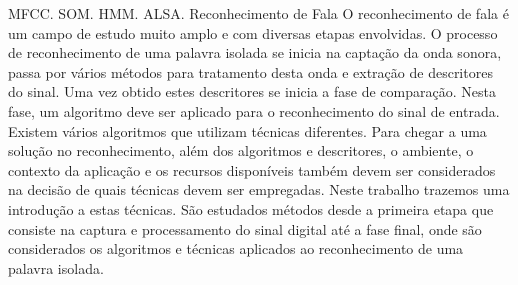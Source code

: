 \begin{resumo}{MFCC. SOM. HMM. ALSA. Reconhecimento de Fala}
\label{sec:resumo}
O  reconhecimento de fala é um campo de estudo muito amplo e com diversas etapas envolvidas. O processo de reconhecimento de uma palavra isolada se inicia na captação da onda sonora, passa por vários métodos para tratamento desta onda e extração de descritores do sinal. Uma vez obtido estes descritores se inicia a fase de comparação. Nesta fase, um algoritmo deve ser aplicado para o reconhecimento do sinal de entrada. Existem vários algoritmos que utilizam técnicas diferentes. Para chegar a uma solução no reconhecimento, além dos algoritmos e descritores, o ambiente, o contexto da aplicação e os recursos disponíveis também devem ser considerados na decisão de quais técnicas devem ser empregadas. Neste trabalho trazemos uma introdução a estas técnicas. São estudados métodos desde a primeira etapa que consiste na captura e processamento do sinal digital até a fase final, onde são considerados os algoritmos e técnicas aplicados ao reconhecimento de uma palavra isolada.
\end{resumo}
\begin{abstract}{MFCC. HMM. Alsa. Speech Recognition}
\label{sec:abstract}
Speech recognition is a very broad field of study and with several steps involved. The recognition process of an isolated word starts in the capture of the sound wave passes through several methods for the treatment of this wave signal and extracting features. Once obtained these features starts the comparison phase. At this stage an algorithm must be applied to the recognition of the input signal. There are several algorithms that use different techniques. To get a solution in addition to the recognition algorithms and features extraction, the environment, the application context and the resources available should also be considered in deciding which techniques should be employed. In this paper we bring an introduction to these techniques. The methods are studied from the first step of the capture and digital signal processing to the final stage, which are considered the algorithms and techniques applied to the recognition of a isolated word.
\end{abstract}